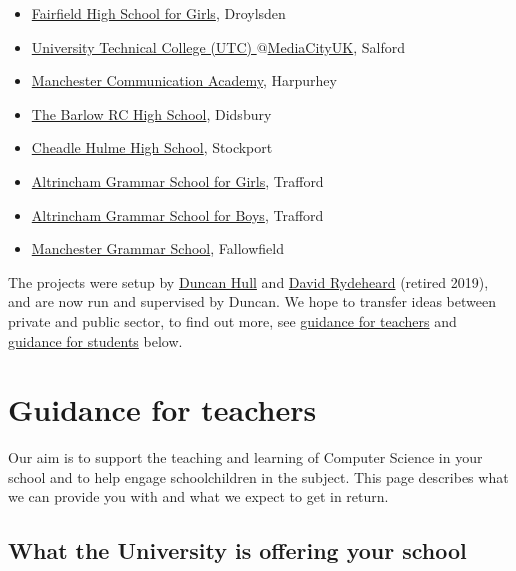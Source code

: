 \documentclass[12pt,]{book}
\providecommand{\tightlist}{%
  \setlength{\itemsep}{0pt}\setlength{\parskip}{0pt}}
\begin{document}
\begin{itemize}
\tightlist
\item
  \href{http://www.fairfieldhigh.tameside.sch.uk/}{Fairfield High School for Girls}, Droylsden
\item
  \href{http://www.utcmediacityuk.org.uk/}{University Technical College (UTC) \(@\)MediaCityUK}, Salford
\item
  \href{https://www.manchestercommunicationacademy.com/}{Manchester Communication Academy}, Harpurhey
\item
  \href{https://thebarlowrchigh.co.uk/}{The Barlow RC High School}, Didsbury
\item
  \href{https://www.chhs.org.uk/}{Cheadle Hulme High School}, Stockport
\item
  \href{http://www.aggs.trafford.sch.uk/}{Altrincham Grammar School for Girls}, Trafford
\item
  \href{https://www.agsb.co.uk/}{Altrincham Grammar School for Boys}, Trafford
\item
  \href{https://www.mgs.org/}{Manchester Grammar School}, Fallowfield
\end{itemize}

The projects were setup by \protect\hyperlink{contact}{Duncan Hull} and \href{http://www.cs.man.ac.uk/~david/}{David Rydeheard} (retired 2019), and are now run and supervised by Duncan. We hope to transfer ideas between private and public sector, to find out more, see \protect\hyperlink{guidance-for-teachers}{guidance for teachers} and \protect\hyperlink{guidance-for-students}{guidance for students} below.

\hypertarget{guidance-for-teachers}{%
\section{Guidance for teachers}\label{guidance-for-teachers}}

Our aim is to support the teaching and learning of Computer Science in your school and to help engage schoolchildren in the subject. This page describes what we can provide you with and what we expect to get in return.

\hypertarget{what-the-university-is-offering-your-school}{%
\subsection{What the University is offering your school}\label{what-the-university-is-offering-your-school}}
\end{document}
